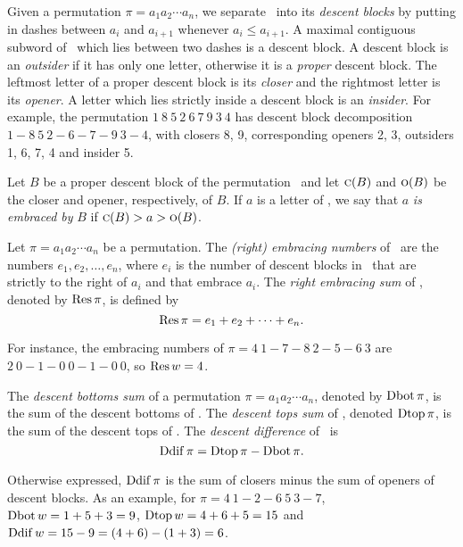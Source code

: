 Given a permutation $\pi = a_1a_2\cdots a_n$, we separate \p\ into its
{\em descent blocks} by putting in dashes between $a_i$ and $a_{i+1}$
whenever $a_i\le a_{i+1}$.  A maximal contiguous subword of \p\ which
lies between two dashes is a descent block.  A descent block is an
{\em outsider}\/ if it has only one letter, otherwise it is a {\em
  proper} descent block. The leftmost letter of a proper descent block
is its {\em closer} and the rightmost letter is its {\em opener}. A
letter which lies strictly inside a descent block is an {\em insider}.
For example, the permutation $1\ 8\ 5\ 2\ 6\ 7\ 9\ 3\ 4$ has descent
block decomposition $1-8\ 5\ 2-6-7-9\ 3-4$, with closers 8, 9,
corresponding openers 2, 3, outsiders 1, 6, 7, 4 and insider 5.

Let $B$ be a proper descent block of the permutation \p\ and let
$\mbox{\sc c}(B)$ and $\mbox{\sc o}(B)$ be the closer and opener, respectively, of $B$.
If $a$ is a letter of \w, we say that $a$ {\em is embraced by} $B$ if
$\mbox{\sc c}(B)> a > \mbox{\sc o}(B)$.

\begin{defn}\label{e numbers}
  Let $\pi=a_1a_2\cdots a_n$ be a permutation.  The {\em (right)
    embracing numbers\/} of \p\ are the numbers $e_1,e_2, \ldots,
  e_n$, where $e_i$ is the number of descent blocks in \p\ that are
  strictly to the right of $a_i$ and that embrace $a_i$.  The {\em
    right embracing sum} of \p, denoted by $\mathop{\rm Res}\pi$, is defined by
$$\mathop{\rm Res}\pi = e_1+e_2+\cdots+e_n.$$
\end{defn}
For instance, the embracing numbers of $\pi=4\ 1-7-8\ 2-5-6\ 3$ are
$2\ 0-1-0\ 0-1-0\ 0$, so $\mathop{\rm Res} w = 4$.

\medskip
\begin{defn}%
  The {\em descent bottoms sum} of a permutation $\pi = a_1a_2\cdots
  a_n$, denoted by $\mathop{\rm Dbot}\nolimits\pi$, is the sum of the descent bottoms of
  \p. The {\em descent tops sum} of \p, denoted $\mathop{\rm Dtop} \pi$, is the
  sum of the descent tops of \p. The {\em descent difference} of \p\
  is
$$ \mathop{\rm Ddif}\nolimits\pi=\mathop{\rm Dtop}\pi-\mathop{\rm Dbot}\nolimits\pi.$$
\end{defn}
Otherwise expressed, $\mathop{\rm Ddif}\nolimits \pi$ is the sum of closers minus the sum
of openers of descent blocks.  As an example, for $\pi =4\ 1-2-6\ 5\
3-7$, $\mathop{\rm Dbot}\nolimits w=1+5+3=9$, $\mathop{\rm Dtop} w= 4+6+5=15$ and $\mathop{\rm Ddif}\nolimits w =
15-9=(4+6)-(1+3)=6$.

